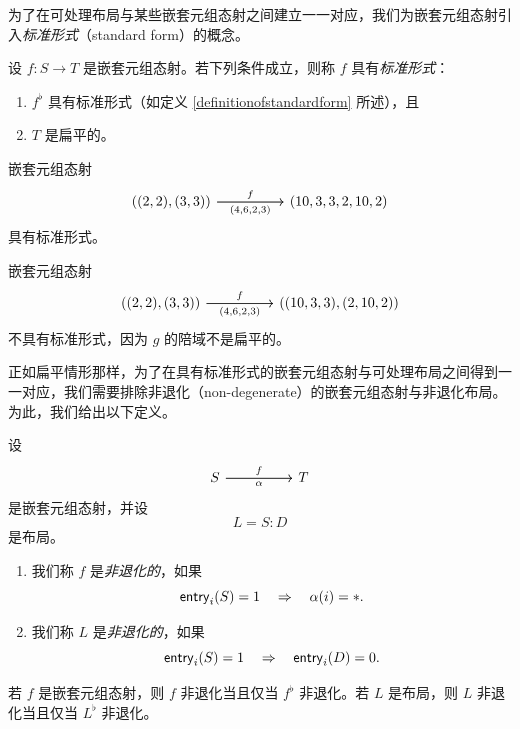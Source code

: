 为了在可处理布局与某些嵌套元组态射之间建立一一对应，我们为嵌套元组态射引入{\it 标准形式}（standard form）的概念。

\begin{definition}\label{definitionofnestedstandardform}
    设 $f:S \to T$ 是嵌套元组态射。若下列条件成立，则称 $f$ 具有{\it 标准形式}：
    \begin{enumerate}
        \item $f^\flat$ 具有标准形式（如定义 \ref{definitionofstandardform} 所述），且
        \item $T$ 是扁平的。
    \end{enumerate}
\end{definition}

\begin{example}
    嵌套元组态射
    \[\begin{tikzcd}
    ((2,2),(3,3)) \ar[rr,"f"] \ar[rr,swap,"(4{,}6{,}2{,}3)"] & & (10,3,3,2,10,2)
    \end{tikzcd} \]
    具有标准形式。
\end{example}
\begin{example}
嵌套元组态射
    \[\begin{tikzcd}
    ((2,2),(3,3)) \ar[rr,"f"] \ar[rr,swap,"(4{,}6{,}2{,}3)"] & & ((10,3,3),(2,10,2))
    \end{tikzcd} \]
    不具有标准形式，因为 $g$ 的陪域不是扁平的。
\end{example}

正如扁平情形那样，为了在具有标准形式的嵌套元组态射与可处理布局之间得到一一对应，我们需要排除非退化（non-degenerate）的嵌套元组态射与非退化布局。为此，我们给出以下定义。

\begin{definition}
    设
    \[
    \begin{tikzcd}
S \ar[rr,"f"] \ar[rr,swap,"\alpha"] & & T
    \end{tikzcd}
    \]
    是嵌套元组态射，并设
    \[
    L = S:D
    \]
    是布局。
    \begin{enumerate}
        \item 我们称 $f$ 是{\it 非退化的}，如果
    \[
    \mathsf{entry}_i(S) = 1 \quad \Rightarrow \quad \alpha(i) = *.
    \]
    \item 我们称 $L$ 是{\it 非退化的}，如果
    \[
    \mathsf{entry}_i(S) = 1 \quad \Rightarrow \quad \mathsf{entry}_i(D) = 0.
    \]
    \end{enumerate}
\end{definition}

\begin{remark}
    若 $f$ 是嵌套元组态射，则 $f$ 非退化当且仅当 $f^\flat$ 非退化。若 $L$ 是布局，则 $L$ 非退化当且仅当 $L^\flat$ 非退化。
\end{remark}


